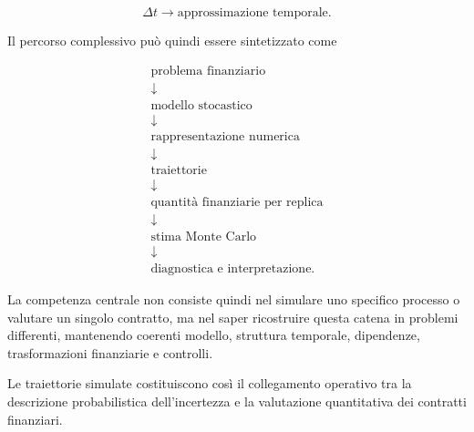 \[
\Delta t
\longrightarrow
\text{approssimazione temporale}.
\]

Il percorso complessivo pu\`o quindi essere sintetizzato come

\[
\begin{array}{c}
\text{problema finanziario}
\\[3pt]
\downarrow
\\[3pt]
\text{modello stocastico}
\\[3pt]
\downarrow
\\[3pt]
\text{rappresentazione numerica}
\\[3pt]
\downarrow
\\[3pt]
\text{traiettorie}
\\[3pt]
\downarrow
\\[3pt]
\text{quantit\`a finanziarie per replica}
\\[3pt]
\downarrow
\\[3pt]
\text{stima Monte Carlo}
\\[3pt]
\downarrow
\\[3pt]
\text{diagnostica e interpretazione}.
\end{array}
\]

La competenza centrale non consiste quindi nel simulare uno specifico
processo o valutare un singolo contratto, ma nel saper ricostruire questa
catena in problemi differenti, mantenendo coerenti modello, struttura
temporale, dipendenze, trasformazioni finanziarie e controlli.

Le traiettorie simulate costituiscono cos\`i il collegamento operativo tra la
descrizione probabilistica dell'incertezza e la valutazione quantitativa dei
contratti finanziari.


